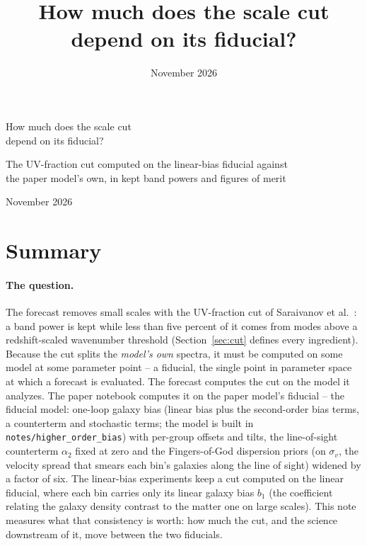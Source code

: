 \documentclass[11pt]{article}
\title{How much does the scale cut depend on its fiducial?}
\date{November 2026}
\author{}
\newcommand{\us}{\_\allowbreak}
\begin{document}
\begin{center}
  {\LARGE How much does the scale cut\\[0.3em]
    depend on its fiducial?\par}
  \vspace{0.6em}
  {\large The UV-fraction cut computed on the linear-bias fiducial
    against\\ the paper model's own, in kept band powers and figures
    of merit\par}
  \vspace{1em}
  {\large November 2026\par}
\end{center}
\vspace{1em}

\section{Summary}
\label{sec:summary}

\paragraph{The question.}
The forecast removes small scales with the UV-fraction cut of
Saraivanov et al.~\cite{Saraivanov2026}: a band power is kept while
less than five percent of it comes from modes above a redshift-scaled
wavenumber threshold (Section~\ref{sec:cut} defines every
ingredient).  Because the cut splits the \emph{model's own} spectra,
it must be computed on some model at some parameter point -- a
fiducial, the single point in parameter space at which a forecast is
evaluated.  The forecast computes the cut on the model it analyzes.
The paper notebook computes it on the paper model's fiducial -- the
fiducial model: one-loop galaxy bias (linear bias plus the
second-order bias terms, a counterterm and stochastic terms; the model
is built in \texttt{notes/higher\us order\us bias}) with per-group
offsets and
tilts, the line-of-sight
counterterm $\alpha_2$ fixed at zero and the Fingers-of-God
dispersion priors (on $\sigma_v$, the velocity spread that smears each
bin's galaxies along the line of sight) widened by a factor of six.  The linear-bias
experiments keep a cut computed on the linear fiducial, where each
bin carries only its linear galaxy bias $b_1$ (the coefficient
relating the galaxy density contrast to the matter one on large
scales).  This note measures what that consistency is worth: how much
the cut, and the science downstream of it, move between the two
fiducials.
\end{document}
